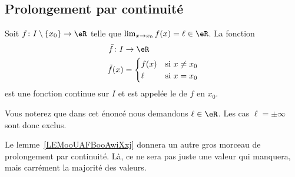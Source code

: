 \subsection{Prolongement par continuité}

\begin{propositionDef}
    Soit \( f\colon I\setminus\{ x_0 \}\to \eR\) telle que \( \lim_{x\to x_{0}} f(x)=\ell\in \eR\). La fonction
    \begin{equation}
        \begin{aligned}
            \tilde f\colon I&\to \eR \\
            \tilde f(x)&=\begin{cases}
                f(x)    &   \text{si } x\neq x_0\\
                \ell    &    \text{si } x=x_0
            \end{cases}
        \end{aligned}
    \end{equation}
    est une fonction continue sur \( I\) et est appelée le  de \( f\) en \( x_0\).
\end{propositionDef}
Vous noterez que dans cet énoncé nous demandons \( \ell\in \eR\). Les cas \( \ell=\pm\infty\) sont donc exclus.

\begin{normaltext}
    Le lemme~\ref{LEMooUAFBooAwiXxj} donnera un autre gros morceau de prolongement par continuité. Là, ce ne sera pas juste une valeur qui manquera, mais carrément la majorité des valeurs.
\end{normaltext}

